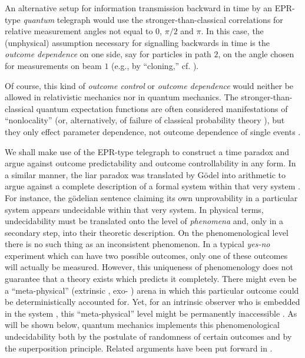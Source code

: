 An alternative setup for information transmission backward in time
by an EPR-type {\em quantum} telegraph would use the
stronger-than-classical correlations for relative measurement angles
not equal to $0$, $\pi /2$ and $\pi$. In this case, the (unphysical)
assumption necessary for signalling backwards in
time is the {\em outcome dependence} on one side, say for particles in
path
${2}$, on the angle chosen for measurements on beam ${1}$
(e.g., by ``cloning,'' cf.
\cite{herbert,wo-zu-82,mil-har-82,mandel,glauber}).



Of course, this kind of {\em outcome control} or {\em outcome
dependence} would
neither be allowed in relativistic mechanics nor in quantum mechanics.
The
stronger-than-classical quantum expectation functions
are often considered manifestations
of ``nonlocality'' \cite{bell} (or, alternatively, of failure of
classical probability theory \cite{pitowsky}), but they only effect
parameter dependence, not outcome dependence of single events
\cite{shimony,shimony3}.

We shall make use of the EPR-type telegraph to construct a time paradox
and argue against outcome predictability and outcome controllability in
any form.
In a similar
manner, the liar paradox \cite{bible} was translated by G\"odel into
arithmetic
\cite{godel} to argue against a complete description of a formal system
within that very system \cite{burks}.
For instance, the g\"odelian sentence \cite{popper-50}
claiming its own
unprovability in a particular system appears undecidable within that
very system.
In physical terms,
undecidability must be translated onto the level of {\em
phenomena} and, only in a secondary step, into their theoretic
description.
On the phenomenological level there is no such
thing as an inconsistent phenomenon.
In a typical {\em yes-no} experiment which can have two
possible outcomes, only one of these outcomes will actually be measured.
However, this uniqueness of phenomenology does not guarantee that
a theory exists which predicts it completely.
There might even be a ``meta-physical''  (extrinsic \cite{svozil:83},
exo-
\cite{roessler}) arena in which this particular
outcome could be
deterministically accounted for. Yet,
for an intrinsic observer who is embedded in the system
\cite{toffoli:79},
this
``meta-physical'' level might be permanently inaccessible
\cite{ro-cp,svozil-93}. As will be shown below, quantum
mechanics implements this phenomenological undecidability both by the
postulate of randomness of certain outcomes and by the superposition
principle.
Related arguments have been put forward in
\cite{popper-50,rothstein-82,peres-84,wolfram1,moore,elitzur,posiewnik}.


